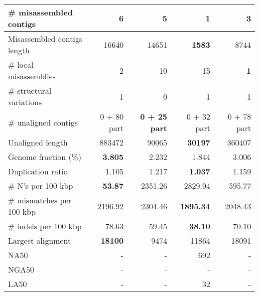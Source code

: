 \documentclass[12pt,a4paper]{article}
\begin{document}
\begin{table}[ht]
\begin{center}
\begin{tabular}{|l*{4}{|r}|}
\# misassembled contigs & 6 & 5 & {\bf 1} & 3 \\ \hline
Misassembled contigs length & 16640 & 14651 & {\bf 1583} & 8744 \\ \hline
\# local misassemblies & 2 & 10 & 15 & {\bf 1} \\ \hline
\# structural variations & 1 & 0 & 1 & 1 \\ \hline
\# unaligned contigs & 0 + 80 part & {\bf 0 + 25 part} & 0 + 32 part & 0 + 78 part \\ \hline
Unaligned length & 883472 & 90065 & {\bf 30197} & 360407 \\ \hline
Genome fraction (\%) & {\bf 3.805} & 2.232 & 1.844 & 3.006 \\ \hline
Duplication ratio & 1.105 & 1.217 & {\bf 1.037} & 1.159 \\ \hline
\# N's per 100 kbp & {\bf 53.87} & 2351.26 & 2829.94 & 595.77 \\ \hline
\# mismatches per 100 kbp & 2196.92 & 2304.46 & {\bf 1895.34} & 2048.43 \\ \hline
\# indels per 100 kbp & 78.63 & 59.45 & {\bf 38.10} & 70.10 \\ \hline
Largest alignment & {\bf 18100} & 9474 & 11864 & 18091 \\ \hline
NA50 & - & - & 692 & - \\ \hline
NGA50 & - & - & - & - \\ \hline
LA50 & - & - & 32 & - \\ \hline
\end{tabular}
\end{center}
\end{table}
\end{document}
